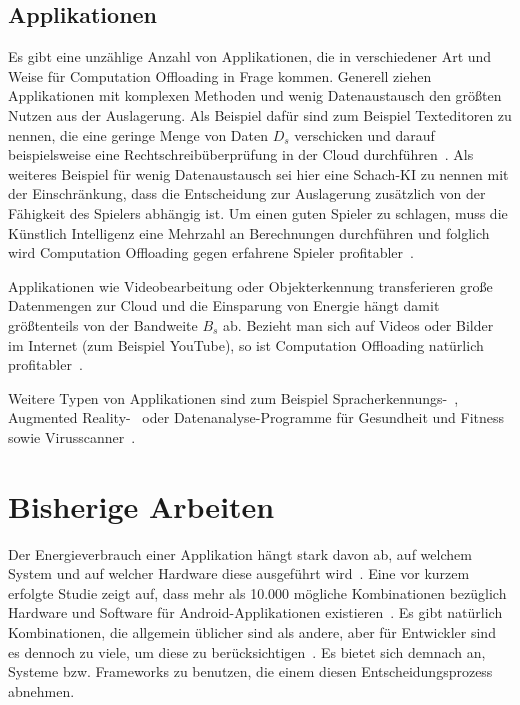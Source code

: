 \documentclass{sigchi}
\begin{document}
\subsection{Applikationen}

Es gibt eine unzählige Anzahl von Applikationen, die in verschiedener Art und Weise für Computation Offloading in Frage kommen.
Generell ziehen Applikationen mit komplexen Methoden und wenig Datenaustausch den größten Nutzen aus der Auslagerung.
Als Beispiel dafür sind zum Beispiel Texteditoren zu nennen, die eine geringe Menge von Daten $D_s$ verschicken und darauf beispielsweise eine Rechtschreibüberprüfung in der Cloud durchführen~\cite{o4}.
Als weiteres Beispiel für wenig Datenaustausch sei hier eine Schach-KI zu nennen mit der Einschränkung, dass die Entscheidung zur Auslagerung zusätzlich von der Fähigkeit des Spielers abhängig ist.
Um einen guten Spieler zu schlagen, muss die Künstlich Intelligenz eine Mehrzahl an Berechnungen durchführen und folglich wird Computation Offloading  gegen erfahrene Spieler profitabler~\cite{o4}. 

Applikationen wie Videobearbeitung oder Objekterkennung transferieren große Datenmengen zur Cloud und die Einsparung von Energie hängt damit größtenteils von der Bandweite $B_s$ ab.
Bezieht man sich auf Videos oder Bilder im Internet (zum Beispiel YouTube), so ist Computation Offloading natürlich profitabler~\cite{o4}.

Weitere Typen von Applikationen sind zum Beispiel Sprach\-er\-kenn\-ungs-~\cite{thinkair}, Augmented Reality-~\cite{O13} oder Da\-ten\-analyse-Programme für Gesundheit und Fitness~\cite{clonecloud} sowie Virusscanner~\cite{thinkair}.

\section{Bisherige Arbeiten}

Der Energieverbrauch einer Applikation hängt stark davon ab, auf welchem System und auf welcher Hardware diese ausgeführt wird~\cite{seeds}.
Eine vor kurzem erfolgte Studie zeigt auf, dass mehr als 10.000 mögliche Kombinationen bezüglich Hardware und Software für Android-Applikationen existieren~\cite{seeds-34}.
Es gibt natürlich Kombinationen, die allgemein üblicher sind als andere, aber für Entwickler sind es dennoch zu viele, um diese zu berücksichtigen~\cite{seeds}.
Es bietet sich demnach an, Systeme bzw. Frameworks zu benutzen, die einem diesen Entscheidungsprozess abnehmen.
\end{document}
